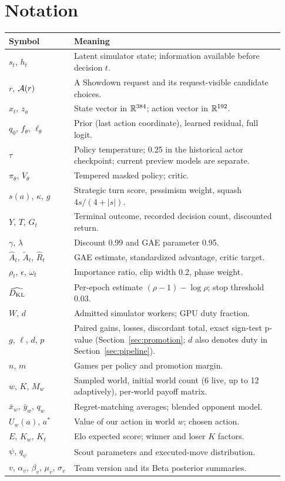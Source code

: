 \section{Notation}
\small
\begin{longtable}{p{0.22\linewidth}p{0.71\linewidth}}
\toprule Symbol & Meaning \\
\midrule\endhead
$s_t$, $h_t$ & Latent simulator state; information available before decision $t$. \\
$r$, $\mathcal{A}(r)$ & A Showdown request and its request-visible candidate choices. \\
$x_t$, $z_a$ & State vector in $\mathbb{R}^{384}$; action vector in $\mathbb{R}^{192}$. \\
$q_0$, $f_\theta$, $\ell_\theta$ & Prior (last action coordinate), learned residual, full logit. \\
$\tau$ & Policy temperature; 0.25 in the historical actor checkpoint; current preview models are separate. \\
$\pi_\theta$, $V_\theta$ & Tempered masked policy; critic. \\
$s(a)$, $\kappa$, $g$ & Strategic turn score, pessimism weight, squash $4s/(4+|s|)$. \\
$Y$, $T$, $G_t$ & Terminal outcome, recorded decision count, discounted return. \\
$\gamma$, $\lambda$ & Discount 0.99 and GAE parameter 0.95. \\
$\widehat A_t$, $\widetilde A_t$, $\widehat R_t$ & GAE estimate, standardized advantage, critic target. \\
$\rho_t$, $\epsilon$, $\omega_t$ & Importance ratio, clip width 0.2, phase weight. \\
$\widehat{D_{\mathrm{KL}}}$ & Per-epoch estimate $(\rho-1)-\log\rho$; stop threshold 0.03. \\
$W$, $d$ & Admitted simulator workers; GPU duty fraction. \\
$g$, $\ell$, $d$, $p$ & Paired gains, losses, discordant total, exact sign-test p-value
(Section~\ref{sec:promotion}; $d$ also denotes duty in Section~\ref{sec:pipeline}). \\
$n$, $m$ & Games per policy and promotion margin. \\
$w$, $K$, $M_w$ & Sampled world, initial world count (6 live, up to 12 adaptively), per-world payoff matrix. \\
$\bar x_w$, $\bar y_w$, $q_w$ & Regret-matching averages; blended opponent model. \\
$U_w(a)$, $a^*$ & Value of our action in world $w$; chosen action. \\
$E$, $K_w$, $K_\ell$ & Elo expected score; winner and loser $K$ factors. \\
$\psi$, $q_\psi$ & Scout parameters and executed-move distribution. \\
$v$, $\alpha_v$, $\beta_v$, $\mu_v$, $\sigma_v$ & Team version and its Beta posterior summaries. \\
\bottomrule
\end{longtable}
\normalsize

